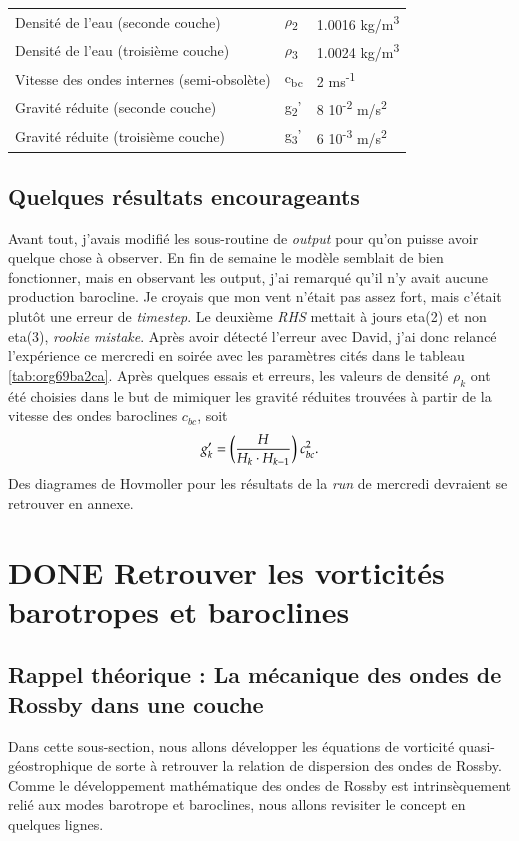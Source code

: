 \documentclass[10pt]{article}
\numberwithin{equation}{section}
\begin{document}
\begin{table}[htbp]
\begin{tabular}{lll}
Densité de l'eau (seconde couche) & \(\rho\)\textsubscript{2} & 1.0016 kg/m\textsuperscript{3}\\[0pt]
Densité de l'eau (troisième couche) & \(\rho\)\textsubscript{3} & 1.0024 kg/m\textsuperscript{3}\\[0pt]
Vitesse des ondes internes (semi-obsolète) & c\textsubscript{bc} & 2 ms\textsuperscript{-1}\\[0pt]
Gravité réduite (seconde couche) & g\textsubscript{2}' & 8 \texttimes{} 10\textsuperscript{-2} m/s\textsuperscript{2}\\[0pt]
Gravité réduite (troisième couche) & g\textsubscript{3}' & 6 \texttimes{} 10\textsuperscript{-3} m/s\textsuperscript{2}\\[0pt]
\hline
\hline
\end{tabular}
\end{table}

\subsection{Quelques résultats encourageants}
\label{sec:org11c7d14}
Avant tout, j'avais modifié les sous-routine de \emph{output} pour qu'on puisse avoir quelque chose à observer.
En fin de semaine le modèle semblait de bien fonctionner, mais en observant les output, j'ai remarqué qu'il n'y avait aucune production barocline.
Je croyais que mon vent n'était pas assez fort, mais c'était plutôt une erreur de \emph{timestep}.
Le deuxième \emph{RHS} mettait à jours eta(2) et non eta(3), \emph{rookie mistake}.
Après avoir détecté l'erreur avec David, j'ai donc relancé l'expérience ce mercredi en soirée avec les paramètres cités dans le tableau \ref{tab:org69ba2ca}.
Après quelques essais et erreurs, les valeurs de densité \(\rho_k\) ont été choisies dans le but de mimiquer les gravité réduites trouvées à partir de la vitesse des ondes baroclines \(c_{bc}\), soit
\begin{equation}
g_k' = \qty(\frac{H}{H_k\cdot H_{k-1}}) \ c_{bc}^2.
\end{equation}
Des diagrames de Hovmoller pour les résultats de la \emph{run} de mercredi devraient se retrouver en annexe.

\section{{\bfseries\sffamily DONE} Retrouver les vorticités barotropes et baroclines}
\label{sec:org2497ca4}
\subsection{\textbf{Rappel théorique} :  La mécanique des ondes de Rossby dans une couche}
\label{sec:orgf962bde}
Dans cette sous-section, nous allons développer les équations de vorticité quasi-géostrophique de sorte à retrouver la relation de dispersion des ondes de Rossby.
Comme le développement mathématique des ondes de Rossby est intrinsèquement relié aux modes barotrope et baroclines, nous allons revisiter le concept en quelques lignes.\bigskip
\end{document}
